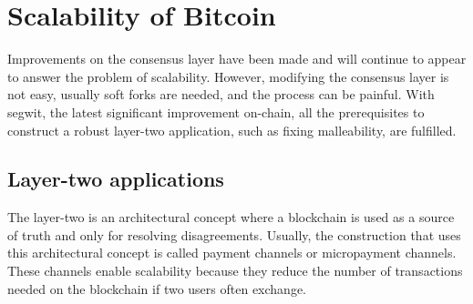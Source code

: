 \section{Scalability of Bitcoin}

Improvements on the consensus layer have been made and will continue to appear
to answer the problem of scalability. However, modifying the consensus layer is
not easy, usually soft forks are needed, and the process can be painful. With
\gls{segwit}, the latest significant improvement on-chain, all the prerequisites
to construct a robust layer-two application, such as fixing malleability, are
fulfilled.

\subsection{Layer-two applications}

The layer-two is an architectural concept where a blockchain is used as a source
of truth and only for resolving disagreements. Usually, the construction that
uses this architectural concept is called payment channels or micropayment
channels. These channels enable scalability because they reduce the number of
transactions needed on the blockchain if two users often exchange.
